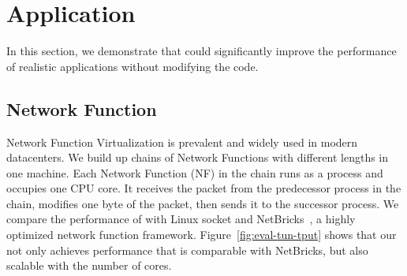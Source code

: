 \section{Application}
\label{sec:application}

In this section, we demonstrate that \sys{} could significantly improve the performance of realistic applications without modifying the code.


\subsection{Network Function}

Network Function Virtualization is prevalent and widely used in modern datacenters. We build up chains of Network Functions with different lengths in one machine. Each Network Function (NF) in the chain runs as a process and occupies one CPU core. It receives the packet from the predecessor process in the chain, modifies one byte of the packet, then sends it to the successor process. We compare the performance of \sys{} with Linux socket and NetBricks~\cite{panda2016netbricks}, a highly optimized network function framework. Figure~\ref{fig:eval-tun-tput} shows that our \sys not only achieves performance that is comparable with NetBricks, but also scalable with the number of cores.



